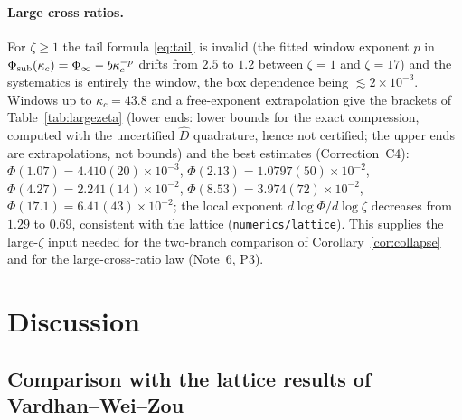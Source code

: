 \documentclass[11pt]{article}
\theoremstyle{accent}
\theoremstyle{definition}
\begin{document}
\paragraph{Large cross ratios.} For \(\zeta\ge1\) the tail formula \eqref{eq:tail} is invalid (the fitted window exponent \(p\) in \(\Phi_{\rm sub}(\kappa_c)=\Phi_\infty-b\kappa_c^{-p}\) drifts from \(2.5\) to \(1.2\) between \(\zeta=1\) and \(\zeta=17\)) and the systematics is entirely the window, the box dependence being \(\lesssim2\times10^{-3}\).  Windows up to \(\kappa_c=43.8\) and a free-exponent extrapolation give the brackets of Table~\ref{tab:largezeta} (lower ends: lower bounds for the exact compression, computed with the uncertified \(\widehat D\) quadrature, hence not certified; the upper ends are extrapolations, not bounds) and the best estimates (Correction~C4): \(\Phi(1.07)=4.410(20)\times10^{-3}\), \(\Phi(2.13)=1.0797(50)\times10^{-2}\), \(\Phi(4.27)=2.241(14)\times10^{-2}\), \(\Phi(8.53)=3.974(72)\times10^{-2}\), \(\Phi(17.1)=6.41(43)\times10^{-2}\); the local exponent \(d\log\Phi/d\log\zeta\) decreases from \(1.29\) to \(0.69\), consistent with the lattice (\texttt{numerics/lattice}).  This supplies the large-\(\zeta\) input needed for the two-branch comparison of Corollary~\ref{cor:collapse} and for the large-cross-ratio law (Note~6, P3).






\section{Discussion}\label{sec:discussion}

\subsection{Comparison with the lattice results of Vardhan--Wei--Zou}
\end{document}
